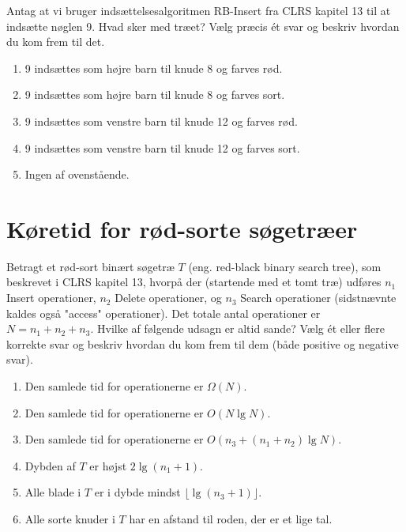 \documentclass{article}
\theoremstyle{definition}
\begin{document}
Antag at vi bruger indsættelsesalgoritmen RB-Insert fra CLRS kapitel 13 til at indsætte nøglen 9. Hvad sker med træet? Vælg præcis ét svar og beskriv hvordan du kom frem til det.

\begin{enumerate}
\item 9 indsættes som højre barn til knude 8 og farves rød.
\item 9 indsættes som højre barn til knude 8 og farves sort.
\item 9 indsættes som venstre barn til knude 12 og farves rød.
\item 9 indsættes som venstre barn til knude 12 og farves sort.
\item Ingen af ovenstående.
\end{enumerate}

\section{Køretid for rød-sorte søgetræer}

Betragt et rød-sort binært søgetræ $T$ (eng. red-black binary search tree), som beskrevet i CLRS kapitel 13, hvorpå der (startende med et tomt træ) udføres $n_1$ Insert operationer, $n_2$ Delete operationer, og $n_3$ Search operationer (sidstnævnte kaldes også "access" operationer). Det totale antal operationer er $N = n_1 + n_2 + n_3$. Hvilke af følgende udsagn er altid sande? Vælg ét eller flere korrekte svar og beskriv hvordan du kom frem til dem (både positive og negative svar).

\begin{enumerate}
\item Den samlede tid for operationerne er $\Omega(N)$.
\item Den samlede tid for operationerne er $O(N \lg N)$.
\item Den samlede tid for operationerne er $O(n_3 + (n_1 + n_2) \lg N)$.
\item Dybden af $T$ er højst $2 \lg(n_1 + 1)$.
\item Alle blade i $T$ er i dybde mindst $\lfloor\lg(n_3 + 1)\rfloor$.
\item Alle sorte knuder i $T$ har en afstand til roden, der er et lige tal.
\end{enumerate}
\end{document}
